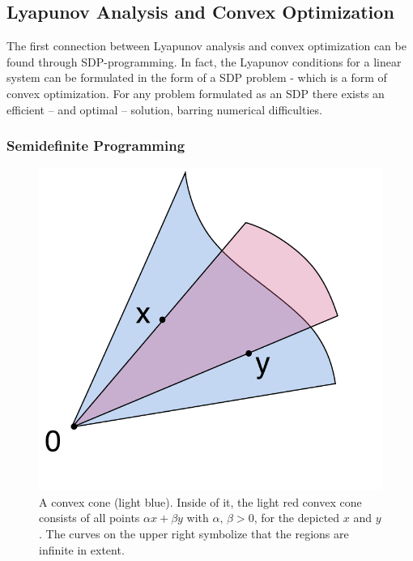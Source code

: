 \subsection{Lyapunov Analysis and Convex Optimization}

The first connection between Lyapunov analysis and convex optimization can be
found through \ac{SDP}-programming. In fact, the Lyapunov conditions for a
linear system can be formulated in the form of a \ac{SDP} problem - which is a
form of convex optimization. For any problem formulated as an \ac{SDP} there
exists an efficient -- and optimal -- solution, barring numerical difficulties.

\subsubsection{Semidefinite Programming}

\begin{figure}
  \centering
  \includegraphics[scale=.5]{figures/preliminaries/Convex_cone_illust}
  \caption[A convex cone illustrated]{A convex cone (light blue). Inside of it, the light red convex cone
    consists of all points \(\alpha x + \beta y \) with \(\alpha,\, \beta > 0\),
    for the depicted \(x\) and \(y\). The curves on the upper right symbolize
    that the regions are infinite in extent.
    \cite{alexandrovConvexConeIllust2019}}
\end{figure}


